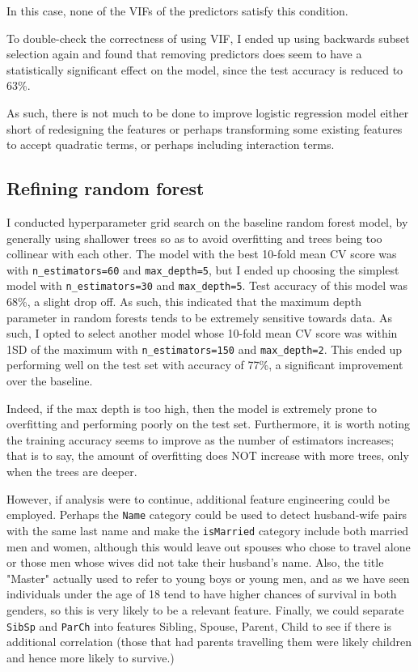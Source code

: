\documentclass[12pt]{article}
\begin{document}
In this case, none of the VIFs of the predictors satisfy this condition.\newline

To double-check the correctness of using VIF, I ended up using backwards subset selection again and found that removing predictors does seem to have a statistically significant effect on the model, since the test accuracy is reduced to 63\%.\newline

As such, there is not much to be done to improve logistic regression model either short of redesigning the features or perhaps transforming some existing features to accept quadratic terms, or perhaps including interaction terms.\newline

\subsection{Refining random forest}

I conducted hyperparameter grid search on the baseline random forest model, by generally using shallower trees so as to avoid overfitting and trees being too collinear with each other. The model with the best 10-fold mean CV score was with \texttt{n\_estimators=60} and \texttt{max\_depth=5}, but I ended up choosing the simplest model with \texttt{n\_estimators=30} and \texttt{max\_depth=5}. Test accuracy of this model was 68\%, a slight drop off. As such, this indicated that the maximum depth parameter in random forests tends to be extremely sensitive towards data. As such, I opted to select another model whose 10-fold mean CV score was within 1SD of the maximum with \texttt{n\_estimators=150} and \texttt{max\_depth=2}. This ended up performing well on the test set with accuracy of 77\%, a significant improvement over the baseline.\newline

Indeed, if the max depth is too high, then the model is extremely prone to overfitting and performing poorly on the test set. Furthermore, it is worth noting the training accuracy seems to improve as the number of estimators increases; that is to say, the amount of overfitting does NOT increase with more trees, only when the trees are deeper.

However, if analysis were to continue, additional feature engineering could be employed. Perhaps the \texttt{Name} category could be used to detect husband-wife pairs with the same last name and make the \texttt{isMarried} category include both married men and women, although this would leave out spouses who chose to travel alone or those men whose wives did not take their husband’s name. Also, the title "Master" actually used to refer to young boys or young men, and as we have seen individuals under the age of 18 tend to have higher chances of survival in both genders, so this is very likely to be a relevant feature. Finally, we could separate \texttt{SibSp} and \texttt{ParCh} into features Sibling, Spouse, Parent, Child to see if there is additional correlation (those that had parents travelling them were likely children and hence more likely to survive.)\newline
\end{document}
